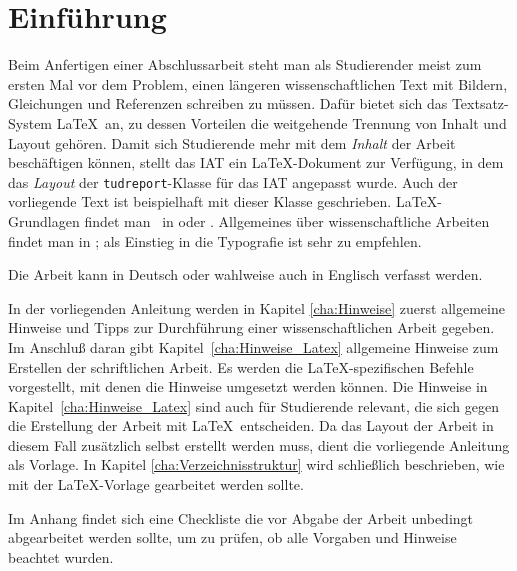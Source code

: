\chapter{Einführung}\label{cha:Intro}
%
Beim Anfertigen einer Abschlussarbeit steht man als Studierender meist zum
ersten Mal vor dem Problem, einen längeren wissenschaftlichen Text mit Bildern,
Gleichungen und Referenzen schreiben zu müssen. Dafür bietet sich das
Textsatz-System \LaTeX\ an, zu dessen Vorteilen die weitgehende Trennung von
Inhalt und Layout gehören. Damit sich Studierende mehr mit dem \emph{Inhalt} der
Arbeit beschäftigen können, stellt das IAT ein \LaTeX-Dokument zur Verfügung, in
dem das \emph{Layout} der \verb|tudreport|-Klasse für das IAT angepasst wurde. Auch der vorliegende Text ist beispielhaft mit dieser Klasse geschrieben. \LaTeX-Grundlagen findet man \zB\ in \cite{Kopka}
oder \cite{Schmidt}. Allgemeines über
wissenschaftliche Arbeiten findet man in \cite{Friedrich}; als Einstieg in
die Typografie ist \cite{Willberg} sehr zu empfehlen.

Die Arbeit kann in Deutsch oder wahlweise auch in Englisch verfasst werden.

In der vorliegenden Anleitung werden in Kapitel \ref{cha:Hinweise} zuerst allgemeine Hinweise und Tipps zur Durchführung einer wissenschaftlichen Arbeit gegeben. Im Anschluß daran gibt Kapitel~\ref{cha:Hinweise_Latex} allgemeine Hinweise zum Erstellen der schriftlichen Arbeit. Es werden die \LaTeX-spezifischen Befehle vorgestellt, mit denen die Hinweise umgesetzt werden können. Die Hinweise in Kapitel~\ref{cha:Hinweise_Latex} sind auch für Studierende relevant, die sich gegen die Erstellung der Arbeit mit \LaTeX\ entscheiden. Da das Layout der Arbeit in diesem Fall zusätzlich selbst erstellt werden muss, dient die vorliegende Anleitung als Vorlage. In Kapitel \ref{cha:Verzeichnisstruktur} wird schließlich beschrieben, wie mit der \LaTeX-Vorlage gearbeitet werden sollte. 

Im Anhang findet sich eine Checkliste die vor Abgabe der Arbeit unbedingt abgearbeitet werden sollte, um zu prüfen, ob alle Vorgaben und Hinweise beachtet wurden.

